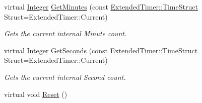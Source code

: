 \begin{DoxyCompactItemize}
virtual \hyperlink{namespacephys_a7f09bf5585b2bb97613cd9aad4273a81}{Integer} \hyperlink{classphys_1_1ExtendedTimer_a4081b9972f76c424b4ca067c8358a926}{GetMinutes} (const \hyperlink{classphys_1_1ExtendedTimer_a0f316e9347d1c118a157cc3c737c554b}{ExtendedTimer::TimeStruct} Struct=ExtendedTimer::Current)
\begin{DoxyCompactList}\small\item\em Gets the current internal Minute count. \item\end{DoxyCompactList}\item 
virtual \hyperlink{namespacephys_a7f09bf5585b2bb97613cd9aad4273a81}{Integer} \hyperlink{classphys_1_1ExtendedTimer_a4b8cd596878863ce9272f0484067c1f3}{GetSeconds} (const \hyperlink{classphys_1_1ExtendedTimer_a0f316e9347d1c118a157cc3c737c554b}{ExtendedTimer::TimeStruct} Struct=ExtendedTimer::Current)
\begin{DoxyCompactList}\small\item\em Gets the current internal Second count. \item\end{DoxyCompactList}\item 
\hypertarget{classphys_1_1ExtendedTimer_a33f0cb87c37031ec54b99d09a522bafb}{
virtual void \hyperlink{classphys_1_1ExtendedTimer_a33f0cb87c37031ec54b99d09a522bafb}{Reset} ()}
\label{classphys_1_1ExtendedTimer_a33f0cb87c37031ec54b99d09a522bafb}


\end{DoxyCompactItemize}
